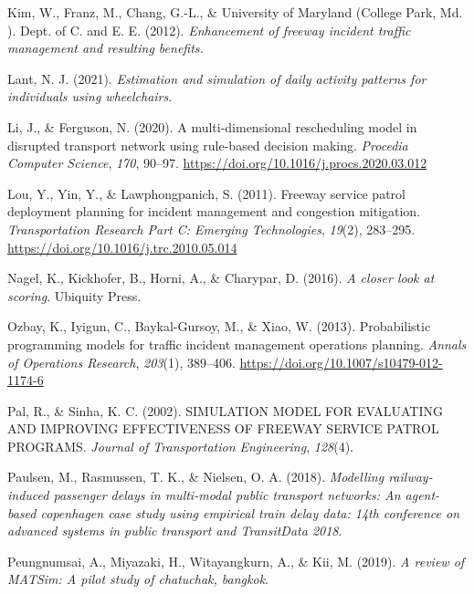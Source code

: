 \documentclass[fancy, oneside, mastersfancy, ms]{byuthesis}
\newlength{\cslhangindent}
\newlength{\cslentryspacingunit} %
\newenvironment{CSLReferences}[2] %
 {%
  \setlength{\parindent}{0pt}
  \ifodd #1
  \let\oldpar\par
  \def\par{\hangindent=\cslhangindent\oldpar}
  \fi
  \setlength{\parskip}{#2\cslentryspacingunit}
 }%
 {}
\begin{document}
\begin{CSLReferences}{1}{0}
\leavevmode{}%
Kim, W., Franz, M., Chang, G.-L., \& University of Maryland (College
Park, Md. ). Dept. of C. and E. E. (2012). \emph{Enhancement of freeway
incident traffic management and resulting benefits.}

\leavevmode{}%
Lant, N. J. (2021). \emph{Estimation and simulation of daily activity
patterns for individuals using wheelchairs}.

\leavevmode{}%
Li, J., \& Ferguson, N. (2020). A multi-dimensional rescheduling model
in disrupted transport network using rule-based decision making.
\emph{Procedia Computer Science}, \emph{170}, 90--97.
\url{https://doi.org/10.1016/j.procs.2020.03.012}

\leavevmode{}%
Lou, Y., Yin, Y., \& Lawphongpanich, S. (2011). Freeway service patrol
deployment planning for incident management and congestion mitigation.
\emph{Transportation Research Part C: Emerging Technologies},
\emph{19}(2), 283--295. \url{https://doi.org/10.1016/j.trc.2010.05.014}

\leavevmode{}%
Nagel, K., Kickhofer, B., Horni, A., \& Charypar, D. (2016). \emph{A
closer look at scoring}. {Ubiquity Press}.

\leavevmode{}%
Ozbay, K., Iyigun, C., Baykal-Gursoy, M., \& Xiao, W. (2013).
Probabilistic programming models for traffic incident management
operations planning. \emph{Annals of Operations Research},
\emph{203}(1), 389--406. \url{https://doi.org/10.1007/s10479-012-1174-6}

\leavevmode{}%
Pal, R., \& Sinha, K. C. (2002). {SIMULATION MODEL FOR EVALUATING AND
IMPROVING EFFECTIVENESS OF FREEWAY SERVICE PATROL PROGRAMS}.
\emph{Journal of Transportation Engineering}, \emph{128}(4).

\leavevmode{}%
Paulsen, M., Rasmussen, T. K., \& Nielsen, O. A. (2018). \emph{Modelling
railway-induced passenger delays in multi-modal public transport
networks: {An} agent-based copenhagen case study using empirical train
delay data: 14th conference on advanced systems in public transport and
{TransitData} 2018}.

\leavevmode{}%
Peungnumsai, A., Miyazaki, H., Witayangkurn, A., \& Kii, M. (2019).
\emph{A review of {MATSim}: {A} pilot study of chatuchak, bangkok}.


\end{CSLReferences}
\end{document}
